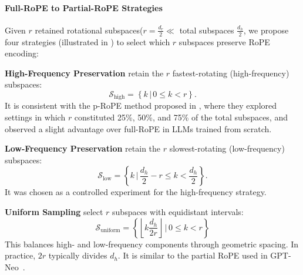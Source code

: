 

\paragraph{Full-RoPE to Partial-RoPE Strategies}  
Given $r$ retained rotational subspaces($r=\frac{d_r}{2}\ll$ total subspaces $\frac{d_h}{2}$, we propose four strategies (illustrated in ) to select which \( r \) subspaces preserve RoPE encoding:

 \textbf{High-Frequency Preservation} retain the \( r \) fastest-rotating (high-frequency) subspaces:
    \[
    \mathcal{S}_{\text{high}} = \left\{ k \,\vert\, 0 \leq k < r \right\}.
    \]
It is consistent with the p-RoPE method proposed in \citet{corr/abs-2410-06205}, where they explored settings in which \(r\) constituted 25\%, 50\%, and 75\% of the total subspaces, and observed a slight advantage over full-RoPE in LLMs trained from scratch.
    
 \textbf{Low-Frequency Preservation} retain the \( r \) slowest-rotating (low-frequency) subspaces:
\[
\mathcal{S}_{\text{low}} = \left\{ k \,\big|\, \frac{d_h}{2} - r \leq k < \frac{d_h}{2} \right\}.
\]
It was chosen as a controlled experiment for the high-frequency strategy.
    
 \textbf{Uniform Sampling} select \( r \) subspaces with equidistant intervals:
\[
\mathcal{S}_{\text{uniform}} = \left\{ \left\lfloor k \frac{d_h}{2r} \right\rfloor \,\bigg|\, 0 \leq k < r \right\}
\]
This balances high- and low-frequency components through geometric spacing.
In practice, \(2r\) typically divides \(d_h\).
It is similar to the partial RoPE used in GPT-Neo~\cite{gpt-neo}.
    
